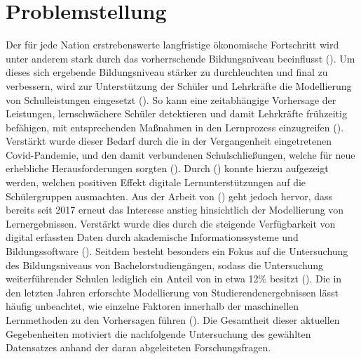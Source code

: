 \chapter[Problemstellung]{Problemstellung}

Der für jede Nation erstrebenswerte langfristige ökonomische Fortschritt wird unter anderem stark durch das vorherrschende Bildungsniveau beeinflusst (\cite[S. 1]{Cortez2008UsingDM}). 
Um dieses sich ergebende Bildungsniveau stärker zu durchleuchten und final zu verbessern, wird zur Unterstützung der Schüler und Lehrkräfte die Modellierung von Schulleistungen eingesetzt (\cite[S. 1]{Cortez2008UsingDM}).
So kann eine zeitabhängige Vorhersage der Leistungen, lernschwächere Schüler detektieren und damit Lehrkräfte frühzeitig befähigen, mit entsprechenden Maßnahmen in den Lernprozess einzugreifen (\cite[S. 2]{Namoun.2021}).
Verstärkt wurde dieser Bedarf durch die in der Vergangenheit eingetretenen Covid-Pandemie, und den damit verbundenen Schulschließungen, welche für neue erhebliche Herausforderungen sorgten (\cite[S. 2]{Clark.2021}).
Durch (\cite[S. 13]{Clark.2021}) konnte hierzu aufgezeigt werden, welchen positiven Effekt digitale Lernunterstützungen auf die Schülergruppen ausmachten.
Aus der Arbeit von (\cite[S. 9]{Namoun.2021}) geht jedoch hervor, dass bereits seit 2017 erneut das Interesse anstieg hinsichtlich der Modellierung von Lernergebnissen.
Verstärkt wurde dies durch die steigende Verfügbarkeit von digital erfassten Daten durch akademische Informationssysteme und Bildungssoftware (\cite[S. 1]{Khan.2021}).
Seitdem besteht besonders ein Fokus auf die Untersuchung des Bildungsniveaus von Bachelorstudiengängen, sodass die Untersuchung weiterführender Schulen lediglich ein Anteil von in etwa 12\% besitzt (\cite[S. 11]{Namoun.2021}).
Die in den letzten Jahren erforschte Modellierung von Studierendenergebnissen lässt häufig unbeachtet, wie einzelne Faktoren innerhalb der maschinellen Lernmethoden zu den Vorhersagen führen (\cite[S. 19]{Namoun.2021}).
Die Gesamtheit dieser aktuellen Gegebenheiten motiviert die nachfolgende Untersuchung des gewählten Datensatzes anhand der daran abgeleiteten Forschungsfragen.